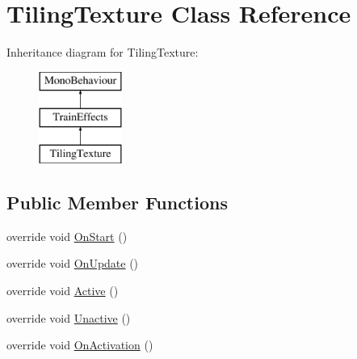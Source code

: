 \hypertarget{class_tiling_texture}{}\section{Tiling\+Texture Class Reference}
\label{class_tiling_texture}
Inheritance diagram for Tiling\+Texture\+:\begin{figure}[H]
\begin{center}
\leavevmode
\includegraphics[height=3.000000cm]{class_tiling_texture}
\end{center}
\end{figure}
\subsection*{Public Member Functions}
\begin{DoxyCompactItemize}
\item 
override void \mbox{\hyperlink{class_tiling_texture_a1af8a5ac35ee619e0fb5db6900d725f6}{On\+Start}} ()
\item 
override void \mbox{\hyperlink{class_tiling_texture_af38d77dd9f6f05e650c74f246a22556d}{On\+Update}} ()
\item 
override void \mbox{\hyperlink{class_tiling_texture_ad2e8292d65a205d9a05c1cc38f23ec6e}{Active}} ()
\item 
override void \mbox{\hyperlink{class_tiling_texture_adf5b4300ae77f9a1602318da7a0ccc96}{Unactive}} ()
\item 
override void \mbox{\hyperlink{class_tiling_texture_a83ea89d5d92568bd86a0c5bd22a3bb41}{On\+Activation}} ()
\end{DoxyCompactItemize}
